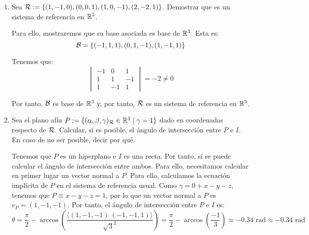 \documentclass[12pt]{article}
\begin{document}
\begin{ejercicio}
\begin{enumerate}
            \item Sea $\mathcal{R}:=\{(1,-1,0), (0,0,1), (1,0,-1), (2,-2,1)\}$. Demostrar que es un sistema de referencia en $\mathbb{R}^3$.
            
            Para ello, mostraremos que su base asociada es base de $\mathbb{R}^3$. Esta es:
            \begin{equation*}
                \mathcal{B} = \left\{(-1, 1, 1), (0, 1, -1), (1, -1, 1)\right\}
            \end{equation*}

            Tenemos que:
            \begin{equation*}
                \begin{vmatrix}
                    -1 & 0 & 1 \\
                    1 & 1 & -1 \\
                    1 & -1 & 1
                \end{vmatrix} = -2 \neq 0
            \end{equation*}

            Por tanto, $\mathcal{B}$ es base de $\mathbb{R}^3$ y, por tanto, $\mathcal{R}$ es un sistema de referencia en $\mathbb{R}^3$.

            \item Sea el plano afín $P:= \{(\alpha,\beta,\gamma)_{\mathcal{R}}\in \mathbb{R}^3\mid \gamma=1\}$ dado en coordenadas respecto de $\mathcal{R}$. Calcular, si es posible, el ángulo de intersección entre $P$ e $I$. En caso de no ser posible, decir por qué.
            
            Tenemos que $P$ es un hiperplano e $I$ es una recta. Por tanto, sí se puede calcular el ángulo de intersección entre ambos.
            Para ello, necesitamos calcular en primer lugar un vector normal a $P$. Para ello, calculamos la ecuación implícita de $P$ en el sistema de referencia usual.
            Como $\gamma = 0+x-y-z$, tenemos que $P\equiv x-y-z=1$,
            por lo que un vector normal a $P$ es $v_P=(1,-1,-1)$.
            Por tanto, el ángulo de intersección entre $P$ e $I$ es:
            \begin{equation*}
                \theta  =\frac{\pi}{2}- \arccos\left(\frac{\langle (1,-1,-1)~(-1,-1,1)\rangle}{\sqrt{3}^2}\right)
                =\frac{\pi}{2}- \arccos\left(\frac{-1}{3}\right)
                \approx -0.34 \text{ rad}
                \approx -0.34 \text{ rad}
            \end{equation*}
        \end{enumerate}
    \end{ejercicio}
\end{document}
